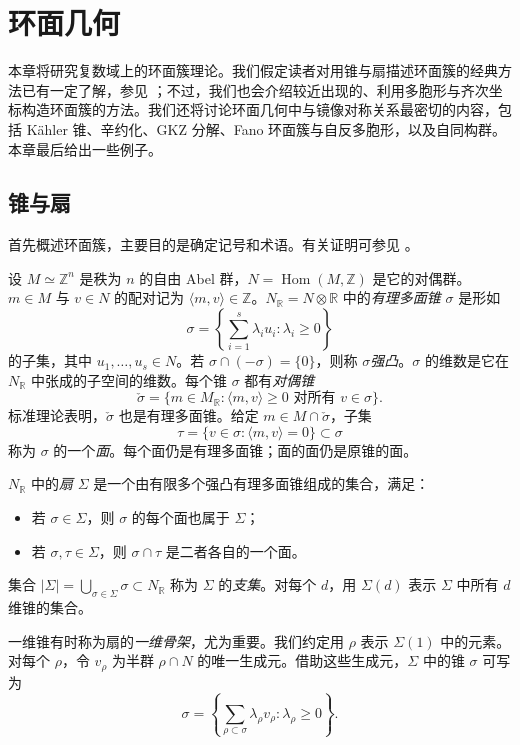 \chapter{环面几何}\label{chap:toric}

本章将研究复数域上的环面簇理论。我们假定读者对用锥与扇描述环面簇的经典方法已有一定了解，参见 ；不过，我们也会介绍较近出现的、利用多胞形与齐次坐标构造环面簇的方法。我们还将讨论环面几何中与镜像对称关系最密切的内容，包括 Kähler 锥、辛约化、GKZ 分解、Fano 环面簇与自反多胞形，以及自同构群。本章最后给出一些例子。

\section{锥与扇}\label{sec:cones-fans}

首先概述环面簇，主要目的是确定记号和术语。有关证明可参见 。

设 $M\simeq\mathbb Z^n$ 是秩为 $n$ 的自由 Abel 群，$N=\operatorname{Hom}(M,\mathbb Z)$ 是它的对偶群。$m\in M$ 与 $v\in N$ 的配对记为 $\langle m,v\rangle\in\mathbb Z$。$N_{\mathbb R}=N\otimes\mathbb R$ 中的\emph{有理多面锥} $\sigma$ 是形如
\[
\sigma=\left\{\sum_{i=1}^{s}\lambda_i u_i:\lambda_i\geq0\right\}
\]
的子集，其中 $u_1,\ldots,u_s\in N$。若 $\sigma\cap(-\sigma)=\{0\}$，则称 $\sigma$\emph{强凸}。$\sigma$ 的维数是它在 $N_{\mathbb R}$ 中张成的子空间的维数。每个锥 $\sigma$ 都有\emph{对偶锥}
\[
\check\sigma=\{m\in M_{\mathbb R}:\langle m,v\rangle\geq0\text{ 对所有 }v\in\sigma\}.
\]
标准理论表明，$\check\sigma$ 也是有理多面锥。给定 $m\in M\cap\check\sigma$，子集
\[
\tau=\{v\in\sigma:\langle m,v\rangle=0\}\subset\sigma
\]
称为 $\sigma$ 的一个\emph{面}。每个面仍是有理多面锥；面的面仍是原锥的面。

$N_{\mathbb R}$ 中的\emph{扇} $\Sigma$ 是一个由有限多个强凸有理多面锥组成的集合，满足：
\begin{itemize}
\item 若 $\sigma\in\Sigma$，则 $\sigma$ 的每个面也属于 $\Sigma$；
\item 若 $\sigma,\tau\in\Sigma$，则 $\sigma\cap\tau$ 是二者各自的一个面。
\end{itemize}
集合 $|\Sigma|=\bigcup_{\sigma\in\Sigma}\sigma\subset N_{\mathbb R}$ 称为 $\Sigma$ 的\emph{支集}。对每个 $d$，用 $\Sigma(d)$ 表示 $\Sigma$ 中所有 $d$ 维锥的集合。

一维锥有时称为扇的\emph{一维骨架}，尤为重要。我们约定用 $\rho$ 表示 $\Sigma(1)$ 中的元素。对每个 $\rho$，令 $v_\rho$ 为半群 $\rho\cap N$ 的唯一生成元。借助这些生成元，$\Sigma$ 中的锥 $\sigma$ 可写为
\[
\sigma=\left\{\sum_{\rho\subset\sigma}\lambda_\rho v_\rho:\lambda_\rho\geq0\right\}.
\]

